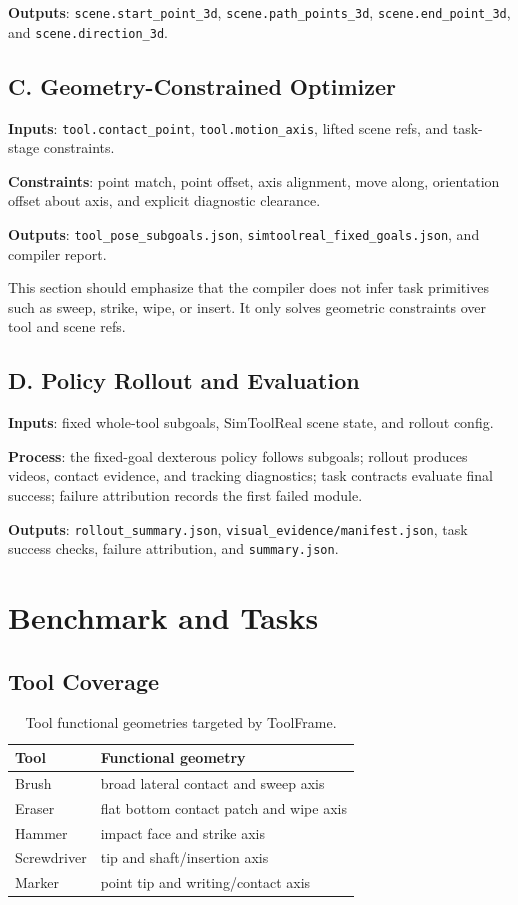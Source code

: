 \documentclass[journal]{IEEEtran}
\newcommand{\method}{ToolFrame}
\begin{document}
\textbf{Outputs}: \texttt{scene.start\_point\_3d},
\texttt{scene.path\_points\_3d}, \texttt{scene.end\_point\_3d}, and
\texttt{scene.direction\_3d}.

\subsection{C. Geometry-Constrained Optimizer}
\textbf{Inputs}: \texttt{tool.contact\_point}, \texttt{tool.motion\_axis},
lifted scene refs, and task-stage constraints.

\textbf{Constraints}: point match, point offset, axis alignment, move along,
orientation offset about axis, and explicit diagnostic clearance.

\textbf{Outputs}: \texttt{tool\_pose\_subgoals.json},
\texttt{simtoolreal\_fixed\_goals.json}, and compiler report.

This section should emphasize that the compiler does not infer task primitives
such as sweep, strike, wipe, or insert. It only solves geometric constraints
over tool and scene refs.

\subsection{D. Policy Rollout and Evaluation}
\textbf{Inputs}: fixed whole-tool subgoals, SimToolReal scene state, and
rollout config.

\textbf{Process}: the fixed-goal dexterous policy follows subgoals; rollout
produces videos, contact evidence, and tracking diagnostics; task contracts
evaluate final success; failure attribution records the first failed module.

\textbf{Outputs}: \texttt{rollout\_summary.json},
\texttt{visual\_evidence/manifest.json}, task success checks, failure
attribution, and \texttt{summary.json}.

\section{Benchmark and Tasks}
\subsection{Tool Coverage}
\begin{table}[h]
\centering
\caption{Tool functional geometries targeted by \method{}.}
\begin{tabular}{ll}
\toprule
Tool & Functional geometry \\
\midrule
Brush & broad lateral contact and sweep axis \\
Eraser & flat bottom contact patch and wipe axis \\
Hammer & impact face and strike axis \\
Screwdriver & tip and shaft/insertion axis \\
Marker & point tip and writing/contact axis \\
\bottomrule
\end{tabular}
\end{table}
\end{document}
